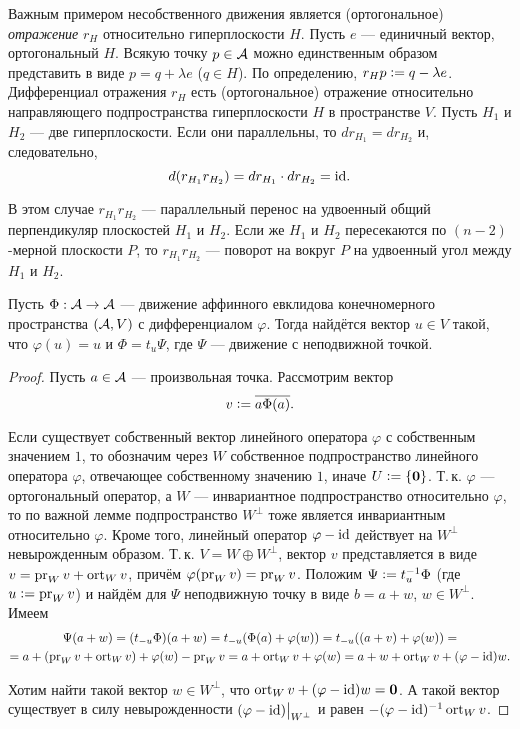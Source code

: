 \begin{example}
    Важным примером несобственного движения является (ортогональное) \textit{отражение} $r_H$ относительно гиперплоскости $H$. Пусть $e$ --- единичный вектор, ортогональный $H$. Всякую точку $p \in \mathcal{A}$ можно единственным образом представить в виде $p = q + \lambda e$ ($q \in H$). По определению, $r_Hp \vcentcolon = q - \lambda e$. Дифференциал отражения $r_H$ есть (ортогональное) отражение относительно направляющего подпространства гиперплоскости $H$ в пространстве $V$. Пусть $H_1$ и $H_2$ --- две гиперплоскости. Если они параллельны, то $dr_{H_1} = dr_{H_2}$ и, следовательно,
    \[
        d(r_{H_1}r_{H_2}) = dr_{H_1} \cdot dr_{H_2} = \mathrm{id}.
    \]

    В этом случае $r_{H_1}r_{H_2}$ --- параллельный перенос на удвоенный общий перпендикуляр плоскостей $H_1$ и $H_2$. Если же $H_1$ и $H_2$ пересекаются по $(n - 2)$-мерной плоскости $P$, то $r_{H_1}r_{H_2}$ --- поворот на вокруг $P$ на удвоенный угол между $H_1$ и $H_2$.
\end{example}

\begin{theorem}
    Пусть $\Phi: \mathcal{A} \to \mathcal{A}$ --- движение аффинного евклидова конечномерного пространства $(\mathcal{A}, V)$ с дифференциалом $\varphi$. Тогда найдётся вектор $u \in V$ такой, что $\varphi(u) = u$ и $\Phi = t_u\Psi$, где $\Psi$ --- движение с неподвижной точкой.
\end{theorem}

\begin{proof}
    Пусть $a \in \mathcal{A}$ --- произвольная точка. Рассмотрим вектор
    \[
        v \vcentcolon = \overline{a\Phi(a)}.
    \]

    Если существует собственный вектор линейного оператора $\varphi$ с собственным значением $1$, то обозначим через $W$ собственное подпространство линейного оператора $\varphi$, отвечающее собственному значению $1$, иначе $U \vcentcolon = \{\boldsymbol{0}\}$. Т.\,к. $\varphi$ --- ортогональный оператор, а $W$ --- инвариантное подпространство относительно $\varphi$, то по важной лемме подпространство $W^\perp$ тоже является инвариантным относительно $\varphi$. Кроме того, линейный оператор $\varphi - \mathrm{id}$ действует на $W^\perp$ невырожденным образом. Т.\,к. $V = W \oplus W^\perp$, вектор $v$ представляется в виде $v = \operatorname{pr}_Wv + \operatorname{ort}_Wv$, причём $\varphi(\operatorname{pr}_Wv) = \operatorname{pr}_Wv$. Положим $\Psi \vcentcolon = t_u^{-1}\Phi$ (где $u \vcentcolon = \operatorname{pr}_Wv$) и найдём для $\Psi$ неподвижную точку в виде $b = a + w$, $w \in W^\perp$. Имеем
    \begin{multline*}
        \Psi(a + w) = (t_{-u}\Phi)(a + w) = t_{-u}(\Phi(a) + \varphi(w)) = t_{-u}((a + v) + \varphi(w)) =\\ = a + (\operatorname{pr}_Wv + \operatorname{ort}_Wv) + \varphi(w) - \operatorname{pr}_Wv = a + \operatorname{ort}_Wv + \varphi(w) = a + w + \operatorname{ort}_Wv + (\varphi - \mathrm{id})w.
    \end{multline*}

    Хотим найти такой вектор $w \in W^\perp$, что $\operatorname{ort}_Wv + (\varphi - \mathrm{id})w = \boldsymbol{0}$. А такой вектор существует в силу невырожденности $(\varphi - \mathrm{id})\big|_{W^\perp}$ и равен $-(\varphi - \mathrm{id})^{-1}\operatorname{ort}_Wv$.
\end{proof}


